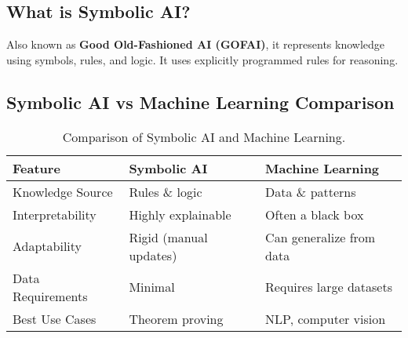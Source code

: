 \subsection{What is Symbolic AI?}
Also known as \textbf{Good Old-Fashioned AI (GOFAI)}, it represents knowledge using symbols, rules, and logic. It uses explicitly programmed rules for reasoning.

\subsection{Symbolic AI vs Machine Learning Comparison}
\begin{table}[h!]
\centering
\begin{tabular}{|l|l|l|}
\hline
\textbf{Feature} & \textbf{Symbolic AI} & \textbf{Machine Learning} \\
\hline
Knowledge Source & Rules \& logic & Data \& patterns \\
Interpretability & Highly explainable & Often a black box \\
Adaptability & Rigid (manual updates) & Can generalize from data \\
Data Requirements & Minimal & Requires large datasets \\
Best Use Cases & Theorem proving & NLP, computer vision \\
\hline
\end{tabular}
\caption{Comparison of Symbolic AI and Machine Learning.}
\end{table}